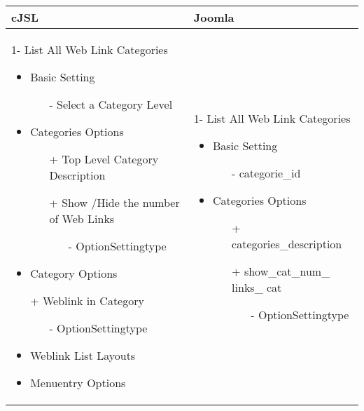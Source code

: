 \begin{minipage}{0.7\textwidth}
\begin{tabular}{|p{} | p{}|}
\hline
\textbf{cJSL} & \textbf{Joomla} \\ 
\hline
 1- List All Web Link Categories
   \begin{itemize}
     \item Basic  Setting 
    		\begin{enumerate}
    			\item[-] Select a Category Level
    		\end{enumerate}
    	\item Categories Options
 	   	\begin{enumerate}
 	    \item[+] Top Level Category Description
 	    \item[+] Show /Hide the number of Web Links 
 	    	  \begin{enumerate}
 	    			 \item[-] OptionSettingtype
 	    	\end{enumerate}
 	   \end{enumerate}
    	\item Category Options
    	\item[+] Weblink in Category 
    		    	  \begin{enumerate}
    		    			 \item[-] OptionSettingtype
    		    	\end{enumerate}
    \item Weblink List Layouts
 	\item Menuentry Options
  \end{itemize}
 & 
1- List All Web Link Categories
  \begin{itemize}
    \item Basic  Setting 
   		\begin{enumerate}
   			\item[-] categorie\_id
   		\end{enumerate}
   	\item Categories Options
	   	\begin{enumerate}
	    \item[+]categories\_description
	    \item[+]show\_cat\_num\_ links\_ cat 
	    	  \begin{enumerate}
	    			 \item[-] OptionSettingtype
	    	\end{enumerate}

\end{enumerate}
\end{itemize}
\end{tabular}
\end{minipage}
